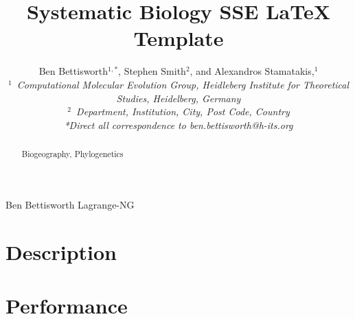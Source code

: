\documentclass[oupdraft]{sysbio_sse}
\begin{document}
\title{Systematic Biology SSE \LaTeX{} Template}

\author{Ben Bettisworth$^{1,\ast}$, Stephen Smith$^{2}$, and
  Alexandros Stamatakis,$^{1}$\\[4pt]
  \textit{$^{1}$~Computational Molecular Evolution Group, Heidleberg Institute for Theoretical Studies, Heidelberg,
    Germany}
  \\
  \textit{$^{2}$~Department, Institution, City, Post Code, Country}
  \\[2pt]
  \textit{*Direct all correspondence to ben.bettisworth@h-its.org}}

\markboth%
{Ben Bettisworth}
{Lagrange-NG}

\maketitle

\begin{abstract}
  {\lipsum[1]}
  {Biogeography, Phylogenetics}
\end{abstract}
\newline

\lipsum[2-3]

\bigskip
\section{Description}
\label{sec:description}

\lipsum[4] \cite{ree_likelihood_2005}


\bigskip
\section{Performance}
\label{sec:performance}
\end{document}
